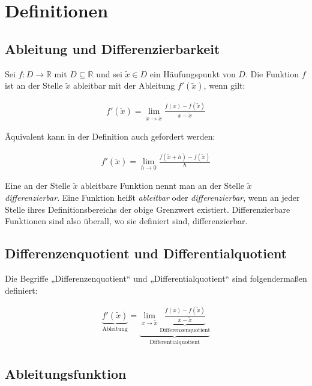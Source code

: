 \documentclass[fontsize=9pt,
               parskip=half-,
               DIV=14,
               listof=chapterentry,
               tocflat]{scrbook}
\begin{document}
\section{Definitionen}

\subsection{Ableitung und Differenzierbarkeit}

\begin{definition*}
Sei $f:D\to \mathbb {R} $ mit $D\subseteq \mathbb {R} $ und sei ${\tilde {x}}\in D$ ein Häufungspunkt von $D$. Die Funktion $f$ ist an der Stelle ${\tilde {x}}$ ableitbar mit der Ableitung $f'({\tilde {x}})$, wenn gilt:

\begin{align*}
f'({\tilde {x}})=\lim _{x\to {\tilde {x}}}{\frac {f(x)-f({\tilde {x}})}{x-{\tilde {x}}}}
\end{align*}

Äquivalent kann in der Definition auch gefordert werden:

\begin{align*}
f'({\tilde {x}})=\lim _{h\to 0}{\frac {f({\tilde {x}}+h)-f({\tilde {x}})}{h}}
\end{align*}

Eine an der Stelle ${\tilde {x}}$ ableitbare Funktion nennt man an der Stelle ${\tilde {x}}$ \emph{differenzierbar}. Eine Funktion heißt \emph{ableitbar} oder \emph{differenzierbar}, wenn an jeder Stelle ihres Definitionsbereichs der obige Grenzwert existiert. Differenzierbare Funktionen sind also überall, wo sie definiert sind, differenzierbar.

\end{definition*}

\subsection{Differenzenquotient und Differentialquotient}

Die Begriffe „Differenzenquotient“ und „Differentialquotient“ sind folgendermaßen definiert:

\begin{align*}
\underbrace {f'({\tilde {x}})} _{\text{Ableitung}}=\underbrace {\lim _{x\to {\tilde {x}}}\underbrace {\tfrac {f(x)-f({\tilde {x}})}{x-{\tilde {x}}}} _{\text{Differenzenquotient}}} _{\text{Differentialquotient}}
\end{align*}

\subsection{Ableitungsfunktion}
\end{document}
